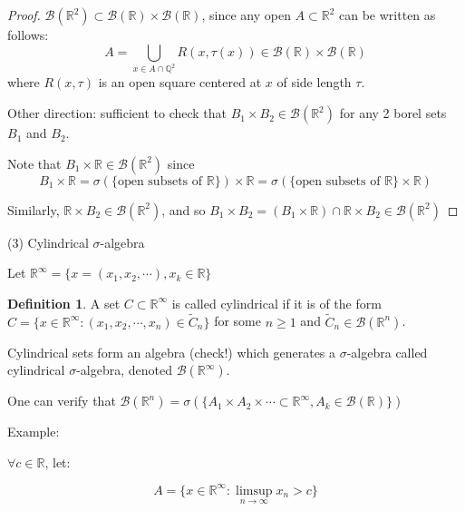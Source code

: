 \documentclass{article}
\numberwithin{equation}{section}
\theoremstyle{definition}
\newtheorem{definition}{Definition}[section]
\newcommand{\R}{\mathbb{R}}
\newcommand{\Q}{\mathbb{Q}}
\newcommand{\mc}[1]{\mathcal{#1}}
\begin{document}
\begin{proof}
    $\mc{B}(\R^2) \subset \mc{B}(\R) \times \mc{B}(\R)$, since any open $A\subset\R^2$ can be written as follows:
    \begin{equation}
        A = \bigcup_{x\in A\cap \Q^2} R(x,\tau(x)) \in \mc{B}(\R) \times \mc{B}(\R)
    \end{equation}
    where $R(x,\tau)$ is an open square centered at $x$ of side length $\tau$.

    Other direction: sufficient to check that $B_1 \times B_2 \in \mc{B}(\R^2)$ for any 2 borel sets $B_1$ and $B_2$.

    Note that $B_1 \times \R \in \mc{B}(\R^2)$ since 
    \begin{equation}
        B_1 \times \R = \sigma(\{\text{open subsets of }\R\}) \times \R = \sigma(\{\text{open subsets of }\R\}\times \R)
    \end{equation}

    Similarly, $\R \times B_2\in \mc{B}(\R^2)$, and so $B_1 \times B_2 = (B_1 \times \R) \cap \R \times B_2 \in \mc{B}(\R^2)$
\end{proof}

(3) Cylindrical $\sigma$-algebra

Let $\R^\infty = \{x = (x_1,x_2,\cdots), x_k \in \R\}$

\begin{definition}
    A set $C \subset \R^\infty$ is called cylindrical if it is of the form $C = \{x \in \R^\infty: (x_1,x_2,\cdots,x_n) \in \tilde{C}_n\}$ for some $n \geq 1$ and $\tilde{C}_n \in \mc{B}(\R^n)$.
\end{definition}

Cylindrical sets form an algebra (check!) which generates a $\sigma$-algebra called cylindrical $\sigma$-algebra, denoted $\mc{B}(\R^\infty)$.


One can verify that $\mc{B}(\R^n) = \sigma(\{A_1 \times A_2 \times \cdots \subset \R^\infty, A_k \in \mc{B}(\R)\})$

Example:

$\forall c \in \R$, let:

\begin{equation}
    A = \{x \in \R^\infty: \limsup_{n \rightarrow\infty} x_n > c\}
\end{equation}
\end{document}
